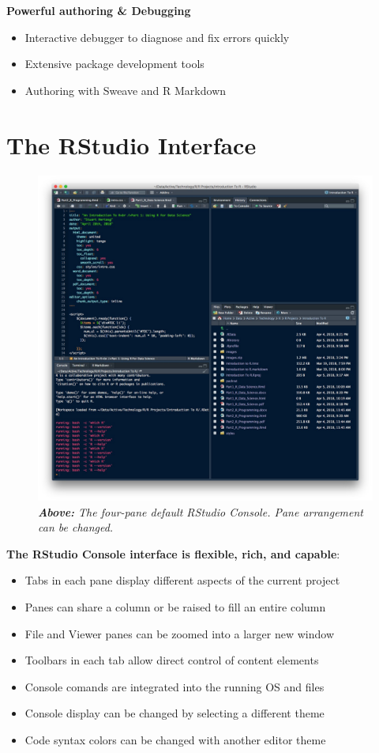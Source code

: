 \documentclass[]{book}
\providecommand{\tightlist}{%
  \setlength{\itemsep}{0pt}\setlength{\parskip}{0pt}}
\theoremstyle{definition}
\theoremstyle{definition}
\theoremstyle{definition}
\theoremstyle{remark}
\begin{document}
\textbf{Powerful authoring \& Debugging}

\begin{itemize}
\tightlist
\item
  Interactive debugger to diagnose and fix errors quickly
\item
  Extensive package development tools
\item
  Authoring with Sweave and R Markdown
\end{itemize}

\hypertarget{the-rstudio-interface}{%
\section{The RStudio Interface}\label{the-rstudio-interface}}

\begin{figure}
\centering
\includegraphics{images/RStudio_console.png}
\caption{\emph{\textbf{Above:} The four-pane default RStudio Console.
Pane arrangement can be changed.}}
\end{figure}

\textbf{The RStudio Console interface is flexible, rich, and capable}:

\begin{itemize}
\tightlist
\item
  Tabs in each pane display different aspects of the current project
\item
  Panes can share a column or be raised to fill an entire column
\item
  File and Viewer panes can be zoomed into a larger new window
\item
  Toolbars in each tab allow direct control of content elements
\item
  Console comands are integrated into the running OS and files
\item
  Console display can be changed by selecting a different theme
\item
  Code syntax colors can be changed with another editor theme
\end{itemize}
\end{document}
